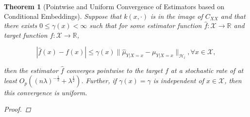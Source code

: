 \documentclass{article}
\newtheorem{theorem}{Theorem}[section]
\numberwithin{equation}{section}
\numberwithin{table}{section}
\numberwithin{algorithm}{section}
\begin{document}
	\begin{theorem}[Pointwise and Uniform Convergence of Estimators based on Conditional Embeddings]
		\label{thm:pointwise_uniform_convergence}
		Suppose that $k(x, \cdot)$ is in the image of $C_{XX}$ and that there exists $0 \leq \gamma(x) < \infty$ such that for some estimator function $\hat{f} : \mathcal{X} \to \mathbb{R}$ and target function  $f : \mathcal{X} \to \mathbb{R}$,
		
		\begin{equation}
		| \hat{f}(x) - f(x) | \leq \gamma(x) \big\| \hat{\mu}_{Y | X = x} - \mu_{Y | X = x} \big\|_{\mathcal{H}_{l}}, \forall x \in \mathcal{X},
		\label{eq:estimator_error_bound}
		\end{equation}
		
		then the estimator $\hat{f}$ converges pointwise to the target $f$ at a stochastic rate of at least $O_{p}((n \lambda)^{-\frac{1}{2}} + \lambda^{\frac{1}{2}})$. Further, if $\gamma(x) = \gamma$ is independent of $x \in \mathcal{X}$, then this convergence is uniform.
		
		\begin{proof}
			

\end{proof}
\end{theorem}
\end{document}
